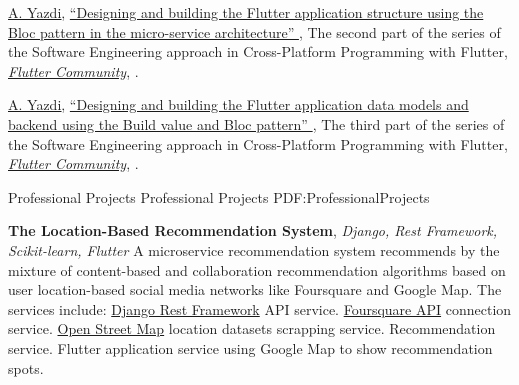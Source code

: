 \documentclass[letterpaper,MMMyyyy,nonstopmode]{resume}
\begin{document}
\begin{Body}
\BigGap
\NumberedItem{[2]}
\href{https://medium.com/@aliyazdi75}
{\underline{A. Yazdi}},
\href{https://medium.com/flutter-community/the-software-engineering-approach-in-cross-platform-programming-with-flutter-part-2-f7b75056102}
{
``Designing and building the Flutter application structure using the Bloc pattern in the micro-service architecture''
},
\newline The second part of the series of the Software Engineering approach in Cross-Platform Programming with Flutter,
\href{https://medium.com/flutter-community}
{\textit{Flutter Community}},
.

\BigGap
\NumberedItem{[3]}
\href{https://medium.com/@aliyazdi75}
{\underline{A. Yazdi}},
\href{https://medium.com/flutter-community/the-software-engineering-approach-in-cross-platform-programming-with-flutter-part-3-34c6eff02af0}
{
``Designing and building the Flutter application data models and backend using the Build value and Bloc pattern''
},
\newline The third part of the series of the Software Engineering approach in Cross-Platform Programming with Flutter,
\href{https://medium.com/flutter-community}
{\textit{Flutter Community}},
.

\endgroup




\Section
{Professional\newline
Projects}
{Professional Projects}
{PDF:ProfessionalProjects}

\BulletItem
\textbf{The Location-Based Recommendation System},
\textit{\small{Django, Rest Framework, Scikit-learn, Flutter}}
\hfill
{\normalsize{
\href{https://github.com/aliyazdi75/Resume/raw/master/BScThesis-Abstract.pdf}
{\faFilePdf}
}}
\Item
A micro­service recommendation system recommends by the mixture of content­-based and collaboration recommendation algorithms based on user location­-based social media networks like Foursquare and Google Map. The services include:
\SubBulletItem
\href{https://www.django-rest-framework.org}{Django Rest Framework} API service.
\SubBulletItem
\href{https://developer.foursquare.com}{Foursquare API} connection service.
\SubBulletItem
\href{https://osm-internal.download.geofabrik.de}{Open Street Map} location datasets scrapping service.
\SubBulletItem
Recommendation service.
\SubBulletItem
Flutter application service using Google Map to show recommendation spots.


\end{Body}
\end{document}
